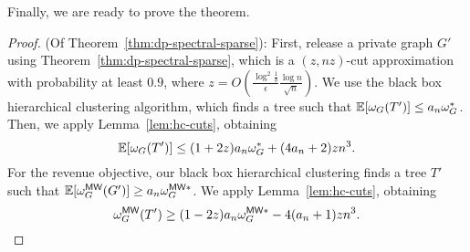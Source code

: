 Finally, we are ready to prove the theorem.
\begin{proof} (Of Theorem~\ref{thm:dp-spectral-sparse}): 
    First, release a private graph $G'$ using Theorem~\ref{thm:dp-spectral-sparse}, which is a $(z, nz)$-cut approximation with probability at least $0.9$, where $z = O(\frac{\log^2 \frac{1}{\delta}}{\epsilon}\frac{\log n}{\sqrt{n}})$. We use the black box hierarchical clustering algorithm, which finds a tree such that $\operatorname{\mathbb{E}}[\omega_G(T')] \leq a_n \omega_G^*$. Then, we apply Lemma~\ref{lem:hc-cuts}, obtaining
    \[
        \operatorname{\mathbb{E}}[\omega_G(T')] \leq (1+2z) a_n \omega_G^* + (4a_n + 2) z n^3.
    \]
    For the revenue objective, our black box hierarchical clustering finds a tree $T'$ such that $\operatorname{\mathbb{E}}[\omega_G^{\textsf{MW}}(G')] \geq a_n \omega_G^{\textsf{MW}*}$. We apply Lemma~\ref{lem:hc-cuts}, obtaining
    \[
        \omega_G^{\textsf{MW}}(T') \geq (1-2z) a_n \omega_{G}^{\textsf{MW}*} - 4(a_n+1)z n^3.
    \]
\end{proof}

